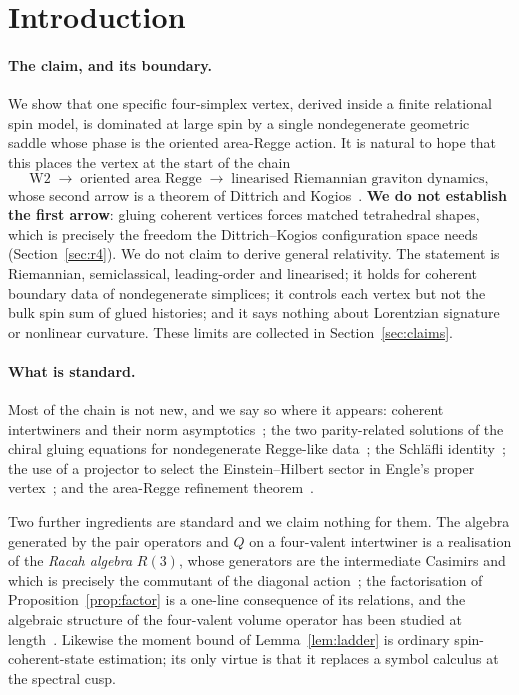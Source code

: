 \documentclass[11pt]{article}
\numberwithin{equation}{section}
\theoremstyle{definition}
\theoremstyle{remark}
\begin{document}
\tableofcontents

\section{Introduction}\label{sec:intro}

\paragraph{The claim, and its boundary.}
We show that one specific four-simplex vertex, derived inside a finite
relational spin model, is dominated at large spin by a single nondegenerate
geometric saddle whose phase is the oriented area-Regge action. It is natural to
hope that this places the vertex at the start of the chain
\[
\text{W2}\;\longrightarrow\;\text{oriented area Regge}\;\longrightarrow\;
\text{linearised Riemannian graviton dynamics},
\]
whose second arrow is a theorem of Dittrich and Kogios~\cite{DittrichKogios2023}.
\textbf{We do not establish the first arrow}: gluing coherent vertices forces
matched tetrahedral shapes, which is precisely the freedom the Dittrich--Kogios
configuration space needs (Section~\ref{sec:r4}). We do not claim to derive
general relativity.
The statement is Riemannian, semiclassical, leading-order and linearised; it holds
for coherent boundary data of nondegenerate simplices; it controls each vertex but
not the bulk spin sum of glued histories; and it says nothing about Lorentzian
signature or nonlinear curvature. These limits are collected in
Section~\ref{sec:claims}.

\paragraph{What is standard.}
Most of the chain is not new, and we say so where it appears: coherent
intertwiners and their norm asymptotics~\cite{LivineSpeziale2007}; the two
parity-related solutions of the chiral gluing equations for nondegenerate
Regge-like data~\cite{BarrettEtAl2009}; the Schläfli identity~\cite{Regge1961};
the use of a projector to select the Einstein--Hilbert sector in Engle's
proper vertex~\cite{Engle2011}; and the area-Regge
refinement theorem~\cite{DittrichKogios2023}.

Two further ingredients are standard and we claim nothing for them. The algebra
generated by the pair operators and $Q$ on a four-valent intertwiner is a
realisation of the \emph{Racah algebra} $R(3)$, whose generators are the
intermediate Casimirs and which is precisely the commutant of the diagonal
action~\cite{Racah2019}; the factorisation of Proposition~\ref{prop:factor} is a
one-line consequence of its relations, and the algebraic structure of the
four-valent volume operator has been studied at
length~\cite{BaezBarrett1999,Schliemann2013}. Likewise the moment bound of
Lemma~\ref{lem:ladder} is ordinary spin-coherent-state estimation; its only
virtue is that it replaces a symbol calculus at the spectral cusp.
\end{document}
